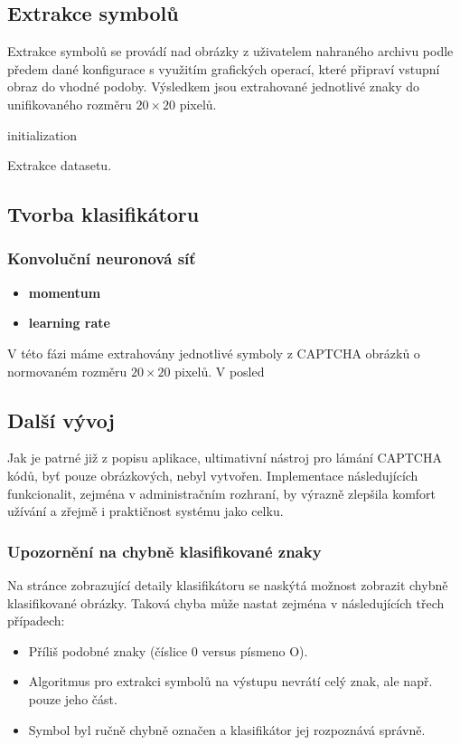 \documentclass[
  field=ainfp,
  master=true,
  biblatex,
  sourcecodes=false,
  theorems=false,
  glossaries,
  index
]{kidiplom}
\begin{document}
\subsection{Extrakce symbolů}
Extrakce symbolů se provádí nad obrázky z uživatelem nahraného archivu podle předem dané konfigurace s využitím grafických operací, které připraví vstupní obraz do vhodné podoby. Výsledkem jsou extrahované jednotlivé znaky do unifikovaného rozměru  $20\times20$ pixelů. \\

\begin{algorithm}[H]
 initialization\;
 \caption{Extrakce datasetu.}
\end{algorithm}

\subsection{Tvorba klasifikátoru}

\subsubsection*{Konvoluční neuronová síť}

\begin{itemize}
\item \textbf{momentum}
\item \textbf{learning rate}
\end{itemize}
V této fázi máme extrahovány jednotlivé symboly z CAPTCHA obrázků o normovaném rozměru $20\times20$ pixelů. V posled

\subsection{Další vývoj}
Jak je patrné již z popisu aplikace, ultimativní nástroj pro lámání CAPTCHA kódů, byť pouze obrázkových, nebyl vytvořen. Implementace následujících funkcionalit, zejména v administračním rozhraní, by výrazně zlepšila komfort užívání a zřejmě i praktičnost systému jako celku.

\subsubsection*{Upozornění na chybně klasifikované znaky} 
Na stránce zobrazující detaily klasifikátoru se naskýtá možnost zobrazit chybně klasifikované obrázky. Taková chyba může nastat zejména v následujících třech případech: 
\begin{itemize}
\item Příliš podobné znaky (číslice 0 versus písmeno O).
\item Algoritmus pro extrakci symbolů na výstupu nevrátí celý znak, ale např. pouze jeho část.
\item Symbol byl ručně chybně označen a klasifikátor jej rozpoznává správně.
\end{itemize}
\end{document}
